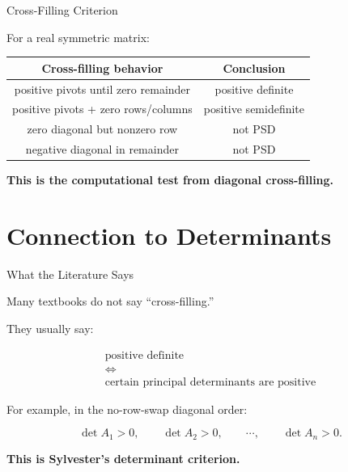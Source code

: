 \documentclass[10pt]{beamer}
\theoremstyle{definition}
\newcommand{\x}[1]{\alert{\textbf{#1}}}
\begin{document}
\begin{frame}{Cross-Filling Criterion}

For a real symmetric matrix:

\vfill

\begin{center}
\small
\renewcommand{\arraystretch}{1.25}
\begin{tabular}{c|c}
\textbf{Cross-filling behavior} & \textbf{Conclusion}\\
\hline
positive pivots until zero remainder & positive definite\\
positive pivots + zero rows/columns & positive semidefinite\\
zero diagonal but nonzero row & not PSD\\
negative diagonal in remainder & not PSD
\end{tabular}
\end{center}

\vfill

\begin{center}
\x{This is the computational test from diagonal cross-filling.}
\end{center}

\end{frame}


\section{Connection to Determinants}

\begin{frame}{What the Literature Says}

Many textbooks do not say ``cross-filling.''

\vfill

They usually say:

\[
\boxed{
\begin{array}{c}
\text{positive definite}\\
\Longleftrightarrow\\
\text{certain principal determinants are positive}
\end{array}}
\]

\vfill

For example, in the no-row-swap diagonal order:

$$
\det A_1>0,\qquad \det A_2>0,\qquad \cdots,\qquad \det A_n>0.
$$

\vfill

\begin{center}
\x{This is Sylvester's determinant criterion.}
\end{center}

\end{frame}
\end{document}
